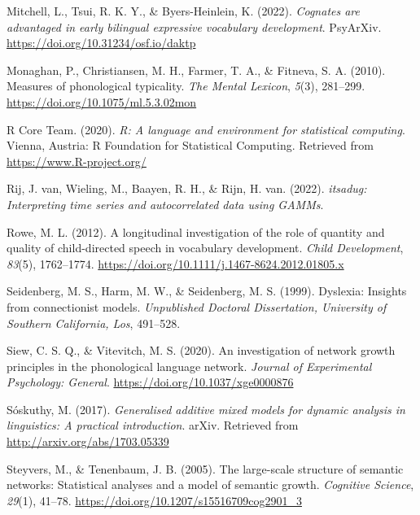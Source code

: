\documentclass[
  man,mask,floatsintext]{apa6}
\newlength{\cslhangindent}
\newlength{\cslentryspacingunit} %
\newenvironment{CSLReferences}[2] %
 {%
  \setlength{\parindent}{0pt}
  \ifodd #1
  \let\oldpar\par
  \def\par{\hangindent=\cslhangindent\oldpar}
  \fi
  \setlength{\parskip}{#2\cslentryspacingunit}
 }%
 {}
\begin{document}
\begin{CSLReferences}{1}{0}
\leavevmode{}%
Mitchell, L., Tsui, R. K. Y., \& Byers-Heinlein, K. (2022). \emph{Cognates are advantaged in early bilingual expressive vocabulary development}. {PsyArXiv}. \url{https://doi.org/10.31234/osf.io/daktp}

\leavevmode{}%
Monaghan, P., Christiansen, M. H., Farmer, T. A., \& Fitneva, S. A. (2010). Measures of phonological typicality. \emph{The Mental Lexicon}, \emph{5}(3), 281--299. \url{https://doi.org/10.1075/ml.5.3.02mon}

\leavevmode{}%
R Core Team. (2020). \emph{R: A language and environment for statistical computing}. Vienna, Austria: R Foundation for Statistical Computing. Retrieved from \url{https://www.R-project.org/}

\leavevmode{}%
Rij, J. van, Wieling, M., Baayen, R. H., \& Rijn, H. van. (2022). \emph{{itsadug}: Interpreting time series and autocorrelated data using GAMMs}.

\leavevmode{}%
Rowe, M. L. (2012). A longitudinal investigation of the role of quantity and quality of child-directed speech in vocabulary development. \emph{Child Development}, \emph{83}(5), 1762--1774. \url{https://doi.org/10.1111/j.1467-8624.2012.01805.x}

\leavevmode{}%
Seidenberg, M. S., Harm, M. W., \& Seidenberg, M. S. (1999). Dyslexia: Insights from connectionist models. \emph{Unpublished Doctoral Dissertation, University of Southern California, Los}, 491--528.

\leavevmode{}%
Siew, C. S. Q., \& Vitevitch, M. S. (2020). An investigation of network growth principles in the phonological language network. \emph{Journal of Experimental Psychology: General}. \url{https://doi.org/10.1037/xge0000876}

\leavevmode{}%
Sóskuthy, M. (2017). \emph{Generalised additive mixed models for dynamic analysis in linguistics: A practical introduction}. arXiv. Retrieved from \url{http://arxiv.org/abs/1703.05339}

\leavevmode{}%
Steyvers, M., \& Tenenbaum, J. B. (2005). The large-scale structure of semantic networks: Statistical analyses and a model of semantic growth. \emph{Cognitive Science}, \emph{29}(1), 41--78. \url{https://doi.org/10.1207/s15516709cog2901_3}


\end{CSLReferences}
\end{document}

